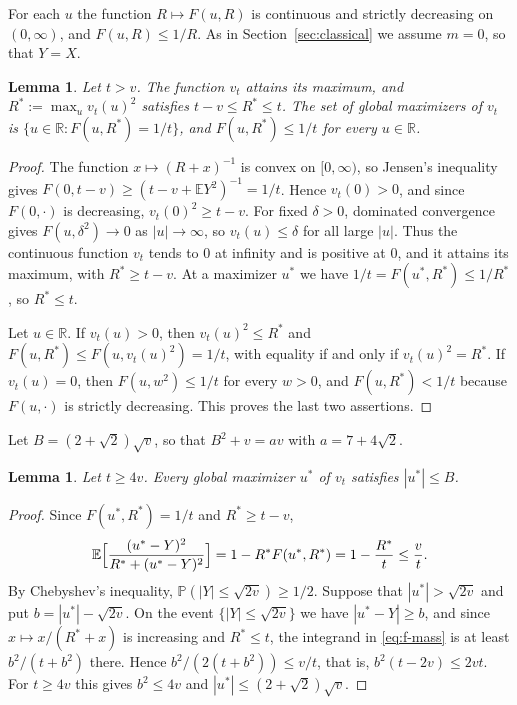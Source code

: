\documentclass[11pt]{amsart}
\newtheorem{lemma}[theorem]{Lemma}
\theoremstyle{definition}
\newcommand{\Prob}{\mathbb{P}}
\newcommand{\E}{\mathbb{E}}
\newcommand{\R}{\mathbb{R}}
\begin{document}
For each $u$ the function $R\mapsto F(u,R)$ is continuous and strictly decreasing on $(0,\infty)$, and
$F(u,R)\le1/R$. As in Section~\ref{sec:classical} we assume $m=0$, so that $Y=X$.

\begin{lemma}\label{lem:f-max}
Let $t>v$. The function $v_t$ attains its maximum, and $R^*:=\max_u v_t(u)^2$ satisfies $t-v\le R^*\le t$. The set of
global maximizers of $v_t$ is $\{u\in\R:F(u,R^*)=1/t\}$, and $F(u,R^*)\le1/t$ for every $u\in\R$.
\end{lemma}

\begin{proof}
The function $x\mapsto(R+x)^{-1}$ is convex on $[0,\infty)$, so Jensen's inequality gives
$F(0,t-v)\ge(t-v+\E Y^2)^{-1}=1/t$. Hence $v_t(0)>0$, and since $F(0,\cdot)$ is decreasing, $v_t(0)^2\ge t-v$. For
fixed $\delta>0$, dominated convergence gives $F(u,\delta^2)\to0$ as $|u|\to\infty$, so $v_t(u)\le\delta$ for all
large $|u|$. Thus the continuous function $v_t$ tends to $0$ at infinity and is positive at $0$, and it attains its
maximum, with $R^*\ge t-v$. At a maximizer $u^*$ we have $1/t=F(u^*,R^*)\le1/R^*$, so $R^*\le t$.

Let $u\in\R$. If $v_t(u)>0$, then $v_t(u)^2\le R^*$ and $F(u,R^*)\le F(u,v_t(u)^2)=1/t$, with equality if and only if
$v_t(u)^2=R^*$. If $v_t(u)=0$, then $F(u,w^2)\le1/t$ for every $w>0$, and $F(u,R^*)<1/t$ because $F(u,\cdot)$ is
strictly decreasing. This proves the last two assertions.
\end{proof}

Let $B=(2+\sqrt2)\sqrt v$, so that $B^2+v=av$ with $a=7+4\sqrt2$.

\begin{lemma}\label{lem:f-window}
Let $t\ge4v$. Every global maximizer $u^*$ of $v_t$ satisfies $|u^*|\le B$.
\end{lemma}

\begin{proof}
Since $F(u^*,R^*)=1/t$ and $R^*\ge t-v$,
\begin{equation}\label{eq:f-mass}
\E\Bigl[\frac{(u^*-Y)^2}{R^*+(u^*-Y)^2}\Bigr]=1-R^*F(u^*,R^*)=1-\frac{R^*}{t}\le\frac vt .
\end{equation}
By Chebyshev's inequality, $\Prob(|Y|\le\sqrt{2v})\ge1/2$. Suppose that $|u^*|>\sqrt{2v}$ and put
$b=|u^*|-\sqrt{2v}$. On the event $\{|Y|\le\sqrt{2v}\}$ we have $|u^*-Y|\ge b$, and since $x\mapsto x/(R^*+x)$ is
increasing and $R^*\le t$, the integrand in \eqref{eq:f-mass} is at least $b^2/(t+b^2)$ there. Hence
$b^2/(2(t+b^2))\le v/t$, that is, $b^2(t-2v)\le2vt$. For $t\ge4v$ this gives $b^2\le4v$ and
$|u^*|\le(2+\sqrt2)\sqrt v$.
\end{proof}
\end{document}
